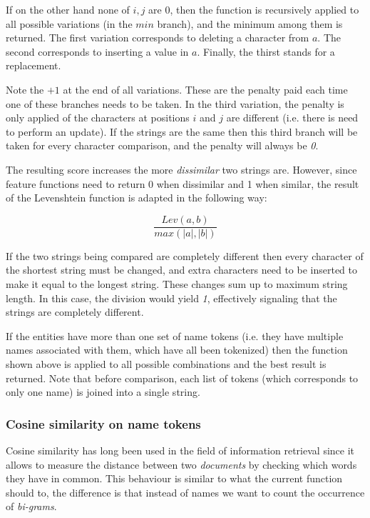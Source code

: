\documentclass[epsfig,a4paper,11pt,titlepage,twoside,openany]{book}
\begin{document}
If on the other hand none of $i,j$ are 0, then the function is recursively applied to all possible variations (in the $min$ branch), and the minimum among them is returned. The first variation corresponds to deleting a character from $a$. The second corresponds to inserting a value in $a$. Finally, the thirst stands for a replacement.

Note the $+1$ at the end of all variations. These are the penalty paid each time one of these branches needs to be taken. In the third variation, the penalty is only applied of the characters at positions $i$ and $j$ are different (i.e. there is need to perform an update). If the strings are the same then this third branch will be taken for every character comparison, and the penalty will always be \textit{0}.

The resulting score increases the more \textit{dissimilar} two strings are. However, since feature functions need to return 0 when dissimilar and 1 when similar, the result of the Levenshtein function is adapted in the following way:

\begin{equation*}
    \frac{Lev(a,b)}{max(|a|,|b|)}
\end{equation*}

If the two strings being compared are completely different then every character of the shortest string must be changed, and extra characters need to be inserted to make it equal to the longest string. These changes sum up to maximum string length. In this case, the division would yield \textit{1}, effectively signaling that the strings are completely different. 

If the entities have more than one set of name tokens (i.e. they have multiple names associated with them, which have all been tokenized) then the function shown above is applied to all possible combinations and the best result is returned. Note that before comparison, each list of tokens (which corresponds to only one name) is joined into a single string.



\subsubsection{Cosine similarity on name tokens}
\label{sec:feature-kernel-similarity-name-tokens}

Cosine similarity has long been used in the field of information retrieval \cite{singhal_modern_information_retrieval} since it allows to measure the distance between two \textit{documents} by checking which words they have in common. This behaviour is similar to what the current function should to, the difference is that instead of names we want to count the occurrence of \textit{bi-grams}. 
\end{document}
